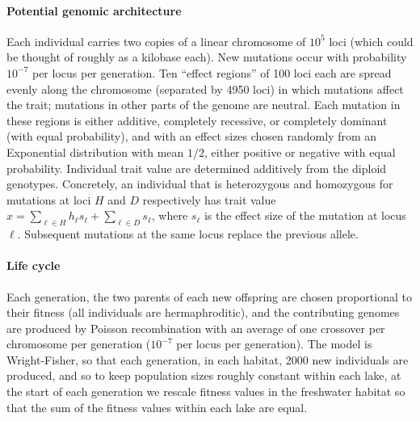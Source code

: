 \documentclass{article}
\begin{document}
\paragraph{Potential genomic architecture}
Each individual carries two copies of a linear chromosome of $10^5$ loci
(which could be thought of roughly as a kilobase each).
New mutations occur with probability $10^{-7}$ per locus per generation.
Ten ``effect regions'' of 100 loci each
are spread evenly along the chromosome (separated by 4950 loci)
in which mutations affect the trait;
mutations in other parts of the genome are neutral.
Each mutation in these regions is either additive, completely recessive,
or completely dominant (with equal probability),
and with an effect sizes chosen randomly from an Exponential distribution with mean $1/2$,
either positive or negative with equal probability.
Individual trait value are determined additively from the diploid genotypes.
Concretely, an individual that is heterozygous and homozygous for mutations
at loci $H$ and $D$ respectively
has trait value
$x = \sum_{\ell \in H} h_\ell s_\ell + \sum_{\ell \in D} s_\ell$,
where $s_\ell$ is the effect size of the mutation at locus $\ell$.
Subsequent mutations at the same locus replace the previous allele.

\paragraph{Life cycle}
Each generation, the two parents of each new offspring are chosen 
proportional to their fitness (all individuals are hermaphroditic),
and the contributing genomes are produced by Poisson recombination
with an average of one crossover per chromosome per generation
($10^{-7}$ per locus per generation).
The model is Wright-Fisher, so that each generation, in each habitat,
2000 new individuals are produced,
and so to keep population sizes roughly constant within each lake,
at the start of each generation we rescale fitness values in the freshwater habitat
so that the sum of the fitness values within each lake are equal.
\end{document}
